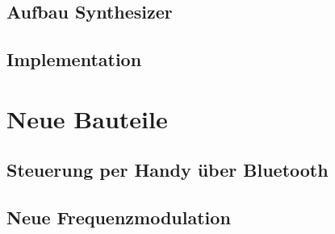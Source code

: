 \subsection{Aufbau Synthesizer}\label{sect.synthesizer_dtp2_DE2115}
\subsection{Implementation}\label{sect.synthesizer_dtp2_DE2115}

\section{Neue Bauteile}\label{sect.synthesizer_neues}
\subsection{Steuerung per Handy über Bluetooth}\label{sect.synthesizer_neues_bluetooth}
\subsection{Neue Frequenzmodulation}\label{sect.synthesizer_neues_FM}

